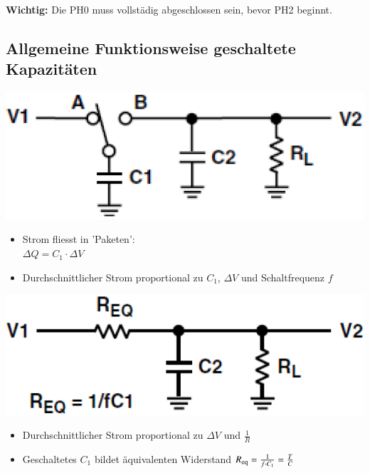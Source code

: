 \textbf{Wichtig:} Die PH0 muss vollstädig abgeschlossen sein, bevor PH2 beginnt.


\subsection{Allgemeine Funktionsweise geschaltete Kapazitäten}

\begin{minipage}[c]{0.46\columnwidth}
    \begin{center}
    \end{center}
    \includegraphics[width=\columnwidth]{images/sc_allgemein.png} 

    \begin{itemize}
        \item Strom fliesst in 'Paketen': \\
            $\Delta Q = C_1 \cdot \Delta V$ 
        \item Durchschnittlicher Strom proportional zu $C_1$, $\Delta V$ und Schaltfrequenz $f$
    \end{itemize}

\end{minipage}
\hfill
\begin{minipage}[c]{0.46\columnwidth}
    \begin{center}
    \end{center}
    \includegraphics[width=\columnwidth]{images/rc_allgemein.png}

    \begin{itemize}
        \item Durchschnittlicher Strom proportional zu $\Delta V$ und $\frac{1}{R}$
        \item Geschaltetes $C_1$ bildet äquivalenten Widerstand $R_{\rm eq} = \frac{1}{f \cdot C_1} = \frac{T}{C}$
    \end{itemize}
\end{minipage}

